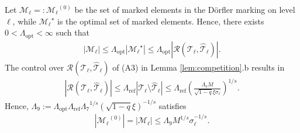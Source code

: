 \documentclass{siamltex1213}
\begin{document}
		Let ${\mathcal M_{\ell}}=:{\mathcal M_{\ell}}^{(0)}$ be the set of marked elements in the D\"orfler 
		marking on level $\ell$, while ${\mathcal M_{\ell}}^{\star}$ is the optimal set of marked elements. 
		Hence, there exists $0<{\ensuremath{\Lambda_{\mathrm{opt}}}}<\infty$ such that 
	\begin{align*}
		{\left\lvert {{\mathcal M_{\ell}}} \right\rvert} \leq {\ensuremath{\Lambda_{\mathrm{opt}}}}{\left\lvert {{\mathcal M_{\ell}}^{\star}} \right\rvert} \leq {\ensuremath{\Lambda_{\mathrm{opt}}}}{\left\lvert {\mathcal R({\mathcal T_{\ell}}, {\hat{\mathcal{T}}_{\ell}})} \right\rvert}.
	\end{align*}
	The control over  $\mathcal R({\mathcal T_{\ell}}, {\hat{\mathcal{T}}_{\ell}})$ of (A3) in  
	Lemma \ref{lem:competition}.b results in
	\begin{align*}
		{\left\lvert {\mathcal R({\mathcal T_{\ell}}, {\hat{\mathcal{T}}_{\ell}})} \right\rvert} \leq  {\ensuremath{\Lambda_{\mathrm{ref}}}}{\left\lvert {{\mathcal T_{\ell}} \setminus {\hat{\mathcal{T}}_{\ell}}} \right\rvert} \leq
		{\ensuremath{\Lambda_{\mathrm{ref}}}} \left(\frac{{\ensuremath{\Lambda_{\mathrm{7}}}} M }{\sqrt{1-q}\xi \sigma_\ell}\right)^{1/s}.
	\end{align*}
	Hence,  ${\ensuremath{\Lambda_{\mathrm{9}}}}:={\ensuremath{\Lambda_{\mathrm{opt}}}}{\ensuremath{\Lambda_{\mathrm{ref}}}} {\ensuremath{\Lambda_{\mathrm{7}}}}^{1/s}(\sqrt{1-q}\xi)^{-1/s}$ satisfies 
	\begin{align}\label{eq:optA}
		{\left\lvert {{\mathcal M_{\ell}}^{(0)}} \right\rvert}={\left\lvert {{\mathcal{M}} _\ell} \right\rvert} \leq {\ensuremath{\Lambda_{\mathrm{9}}}} M^{1/s}\sigma_\ell^{-1/s}.
	\end{align}
\end{document}
